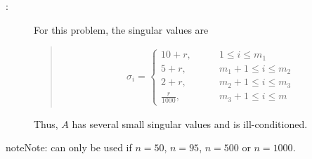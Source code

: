 \documentclass[a4paper,10pt,english]{sphinxmanual}
\begin{document}
\begin{fulllineitems}
\begin{fulllineitems}
\begin{description}
\item[{:}] \leavevmode
For this problem, the singular values are
\begin{quote}
\begin{equation*}
\begin{split}\sigma_i = \left\{ 
\begin{align}
10 + r, & \qquad 1\leq i \leq m_1\\
5 + r, & \qquad m_1+1\leq i \leq m_2\\
2 + r, & \qquad m_2+1\leq i \leq m_3\\
\frac{r}{1000}, & \qquad m_3+1\leq i\leq m
\end{align}
\right.\end{split}
\end{equation*}\end{quote}

Thus, \(A\) has several small singular values and is 
ill-conditioned.

\end{description}

\begin{sphinxadmonition}{note}{Note:}
 can only be used if \(n = 50\), 
\(n = 95\), \(n = 500\) or \(n = 1000\).
\end{sphinxadmonition}

\end{fulllineitems}


\end{fulllineitems}

\end{document}
